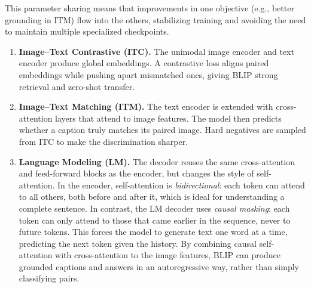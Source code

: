 \begin{enrichment}
\begin{enrichment}
        This parameter sharing means that improvements in one objective (e.g., better grounding in ITM) flow into the others, stabilizing training and avoiding the need to maintain multiple specialized checkpoints.  
        
        \begin{enumerate}
            \item \textbf{Image--Text Contrastive (ITC).} The unimodal image encoder and text encoder produce global embeddings. A contrastive loss aligns paired embeddings while pushing apart mismatched ones, giving BLIP strong retrieval and zero-shot transfer.  
            \item \textbf{Image--Text Matching (ITM).} The text encoder is extended with cross-attention layers that attend to image features. The model then predicts whether a caption truly matches its paired image. Hard negatives are sampled from ITC to make the discrimination sharper.  
            
            \newpage
            
            \item \textbf{Language Modeling (LM).} The decoder reuses the same cross-attention and feed-forward blocks as the encoder, but changes the style of self-attention. In the encoder, self-attention is \emph{bidirectional}: each token can attend to all others, both before and after it, which is ideal for understanding a complete sentence. In contrast, the LM decoder uses \emph{causal masking}: each token can only attend to those that came earlier in the sequence, never to future tokens. This forces the model to generate text one word at a time, predicting the next token given the history. By combining causal self-attention with cross-attention to the image features, BLIP can produce grounded captions and answers in an autoregressive way, rather than simply classifying pairs.
        \end{enumerate}
        

\end{enrichment}
\end{enrichment}
